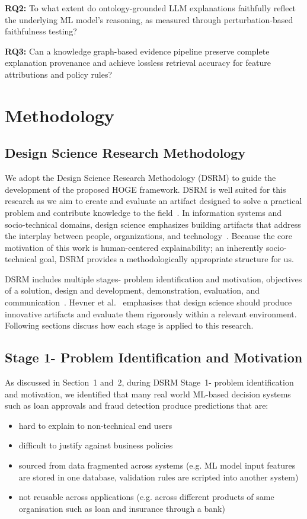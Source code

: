 \documentclass[lnbip]{svmultln}
\begin{document}
\noindent\textbf{RQ2:} To what extent do ontology-grounded LLM explanations faithfully reflect the underlying ML model's reasoning, as measured through perturbation-based faithfulness testing?

\noindent\textbf{RQ3:} Can a knowledge graph-based evidence pipeline preserve complete explanation provenance and achieve lossless retrieval accuracy for feature attributions and policy rules?

\section{Methodology}
\subsection{Design Science Research Methodology}

We adopt the Design Science Research Methodology (DSRM) to guide the development of the proposed HOGE framework. DSRM is well suited for this research as we aim to create and evaluate an artifact designed to solve a practical problem and contribute knowledge to the field~\cite{peffers2007}. In information systems and socio-technical domains, design science emphasizes building artifacts that address the interplay between people, organizations, and technology~\cite{hevner2004}. Because the core motivation of this work is human-centered explainability; an inherently socio-technical goal, DSRM provides a methodologically appropriate structure for us.

DSRM includes multiple stages- problem identification and motivation, objectives of a solution, design and development, demonstration, evaluation, and communication~\cite{peffers2007}. Hevner et al.~\cite{hevner2004} emphasises that design science should produce innovative artifacts and evaluate them rigorously within a relevant environment. Following sections discuss how each stage is applied to this research.

\subsection{Stage 1- Problem Identification and Motivation}
As discussed in Section~1 and~2, during DSRM Stage~1- problem identification and motivation, we identified that many real world ML-based decision systems such as loan approvals and fraud detection produce predictions that are:
\begin{itemize}
    \item hard to explain to non-technical end users
    \item difficult to justify against business policies
    \item sourced from data fragmented across systems (e.g. ML model input features are stored in one database, validation rules are scripted into another system)
    \item not reusable across applications (e.g. across different products of same organisation such as loan and insurance through a bank)
\end{itemize}
\end{document}
